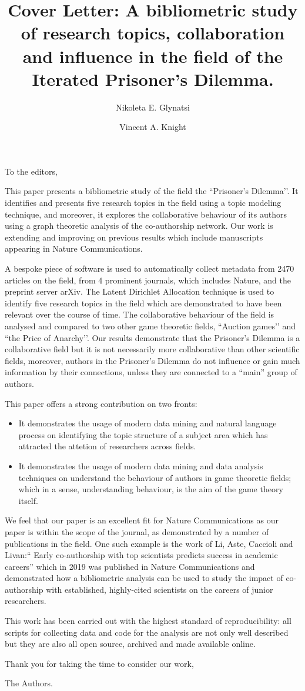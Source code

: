 \documentclass{article}
\title{Cover Letter: A bibliometric study of research topics, collaboration and
influence in the field of the Iterated Prisoner’s Dilemma.}
\author[1]{Nikoleta E. Glynatsi}
\author[1]{Vincent A. Knight}
\affil[1]{Cardiff University, School of Mathematics, Cardiff, United Kingdom}
\date{}
\begin{document}
\maketitle

To the editors,

This paper presents a bibliometric study of the field the ``Prisoner’s
Dilemma’’. It identifies and presents five research topics in the field using a
topic modeling technique, and moreover, it explores the collaborative behaviour
of its authors using a graph theoretic analysis of the co-authorship network.
Our work is extending and improving on previous results which include
manuscripts appearing in Nature Communications.

A bespoke piece of software is used to automatically collect metadata from 2470
articles on the field, from 4 prominent journals, which includes Nature, and the
preprint server arXiv. The Latent Dirichlet Allocation technique is used to
identify five research topics in the field which are demonstrated to have been
relevant over the course of time. The collaborative behaviour of the field is
analysed and compared to two other game theoretic fields, ``Auction games’’ and
``the Price of Anarchy’’. Our results demonstrate that the Prisoner's Dilemma is
a collaborative field but it is not necessarily more collaborative than other
scientific fields, moreover, authors in the Prisoner’s Dilemma do not influence
or gain much information by their connections, unless they are connected to a
``main” group of authors.

This paper offers a strong contribution on two fronts:

\begin{itemize}
    \item It demonstrates the usage of modern data mining and natural language
    process on identifying the topic structure of a subject area which has
    attracted the attetion of researchers across fields.
    \item It demonstrates the usage of modern data mining and data analysis
    techniques on understand the behaviour of authors in game theoretic
    fields; which in a sense, understanding behaviour, is the aim of the game
    theory itself.
\end{itemize}

We feel that our paper is an excellent fit for Nature Communications as our
paper is within the scope of the journal, as demonstrated by a number of
publications in the field. One such example is the work of Li, Aste, Caccioli
and Livan:`` Early co-authorship with top scientists predicts success
in academic careers'' which in 2019 was published in Nature Communications and
demonstrated how a bibliometric analysis can be used to study the impact of
co-authorship with established, highly-cited scientists on the careers of junior
researchers.

This work has been carried out with the highest standard of reproducibility: all
scripts for collecting data and code for the analysis are not only well
described but they are also all open source, archived and made available online.

Thank you for taking the time to consider our work,

The Authors.
\end{document}
